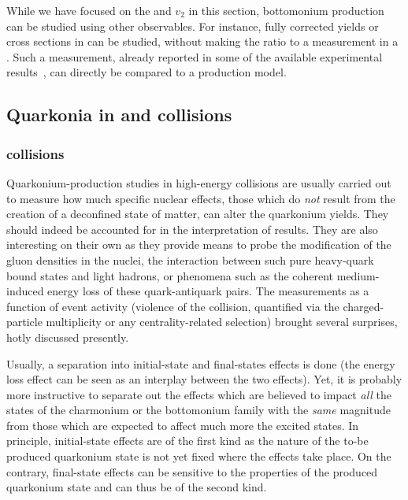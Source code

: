 \documentclass[../report.tex]{subfiles}
\begin{document}
While we have focused on the \raa and $v_2$ in this section, bottomonium production can be studied using other observables. For instance, fully corrected yields or cross sections
in \PbPb can be studied, without making the ratio to a \pp measurement in a \raa. Such a measurement, already reported in some of the available experimental results~\cite{Sirunyan:2018nsz},
can directly be compared to a production model. 



\subsection{Quarkonia in \pPb and \pp collisions}%

\subsubsection{\pPb collisions} %
Quarkonium-production studies in high-energy \pPb collisions are usually carried out to measure how much specific nuclear effects, those which do {\it not} result from the creation of a deconfined state of matter, can alter the quarkonium yields. They should indeed be accounted for in the interpretation of \PbPb  results. They are also interesting on their own as they provide means to probe the modification of the gluon densities in the nuclei, the interaction between such pure heavy-quark bound states and light hadrons, or phenomena such as the coherent medium-induced energy loss of these quark-antiquark pairs.
The measurements as a function of event activity (violence of the collision, quantified via the charged-particle multiplicity or any centrality-related selection) brought several surprises, hotly discussed presently.
 
 Usually, a separation into initial-state and final-states effects is done (the energy loss effect can be seen as an interplay between the two effects). Yet, it is probably more instructive to separate out the effects which are believed to impact {\it all} the states of the charmonium or the bottomonium family with the {\it same} magnitude from those which are expected to affect much more the excited states. In principle, initial-state effects are of the first kind as the nature of the to-be produced quarkonium state is not yet fixed where the effects take place.  On the contrary, final-state effects can be sensitive to the properties of the produced quarkonium state and can thus be of the second kind.
 
\end{document}
